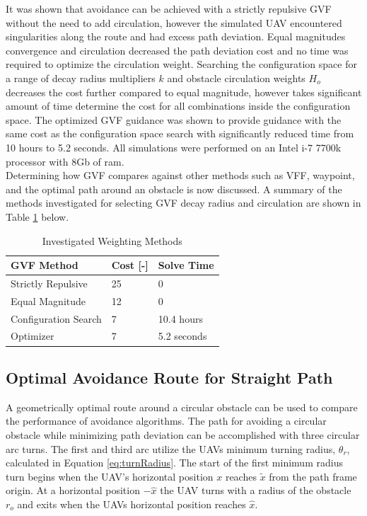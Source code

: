 \documentclass[numbered,pdftex]{ohio-etd}
\begin{document}
It was shown that avoidance can be achieved with a strictly repulsive GVF without the need to add circulation, however the simulated UAV encountered singularities along the route and had excess path deviation. Equal magnitudes convergence and circulation decreased the path deviation cost and no time was required to optimize the circulation weight. Searching the configuration space for a range of decay radius multipliers $k$ and obstacle circulation weights $H_o$ decreases the cost further compared to equal magnitude, however takes significant amount of time determine the cost for all combinations inside the configuration space. The optimized GVF guidance was shown to provide guidance with the same cost as the configuration space search with significantly reduced time from 10 hours to 5.2 seconds. All simulations were performed on an Intel i-7 7700k processor with 8Gb of ram. \\


Determining how GVF compares against other methods such as VFF, waypoint, and the optimal path around an obstacle is now discussed. A summary of the methods investigated for selecting GVF decay radius and circulation are shown in Table \ref{table:gvfMethodTable} below.




\begin{table}[]
	\centering
	\caption{Investigated Weighting Methods}
	\label{table:gvfMethodTable}
	\begin{tabular}{|l|l|l|}
		\hline
		GVF Method           & Cost {[}-{]} & Solve Time  \\ \hline
		Strictly Repulsive   & 25           & 0           \\ \hline
		Equal Magnitude      & 12           & 0           \\ \hline
		Configuration Search & 7            & 10.4 hours  \\ \hline
		Optimizer            & 7            & 5.2 seconds \\ \hline
	\end{tabular}
\end{table}



\subsection{Optimal Avoidance Route for Straight Path}
A geometrically optimal route around a circular obstacle can be used to compare the performance of avoidance algorithms. The path for avoiding a circular obstacle while minimizing path deviation can be accomplished with three circular arc turns. The first and third arc utilize the UAVs minimum turning radius, $\theta_r$, calculated in Equation \ref{eq:turnRadius}. The start of the first minimum radius turn begins when the UAV's horizontal position $x$ reaches  $\tilde{x}$ from the path frame origin. At a horizontal position $-\hat{x}$ the UAV turns with a radius of the obstacle $r_o$ and exits when the UAVs horizontal position reaches $\hat{x}$. 
\end{document}
